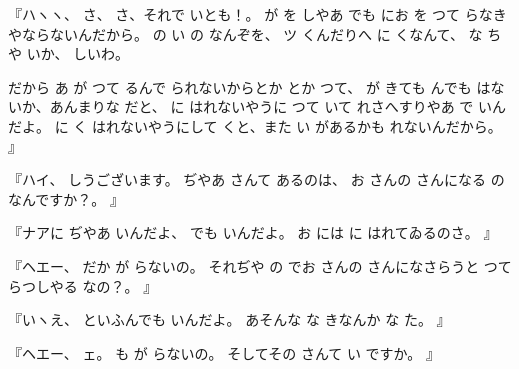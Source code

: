 『ハヽヽ、
さ、
さ、それで
いとも！。
が
を
しやあ
でも
にお
を
つて
らなきやならないんだから。
の
い
の
なんぞを、
ツ
くんだりへ
に
くなんて、
な
ちや
いか、
しいわ。

だから
あ
が
つて
るんで
られないからとか
とか
つて、
が
きても
んでも
はないか、あんまりな
だと、
に
はれないやうに
つて
いて
れさへすりやあ
で
いんだよ。
に
く
はれないやうにして
くと、また
い
があるかも
れないんだから。
』

『ハイ、
しうございます。
ぢやあ
さんて
あるのは、
お
さんの
さんになる
の
なんですか？。
』

『ナアに
ぢやあ
いんだよ、
でも
いんだよ。
お
には
に
はれてゐるのさ。
』

『ヘエー、
だか
が
らないの。
それぢや
の
でお
さんの
さんになさらうと
つて
らつしやる
なの？。
』

『いヽえ、
といふんでも
いんだよ。
あそんな
な
きなんか
な
た。
』

『ヘエー、
ェ。
も
が
らないの。
そしてその
さんて
い
ですか。
』

